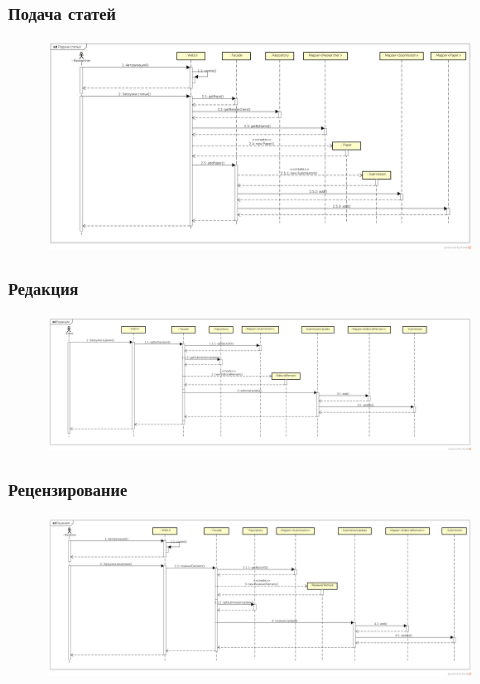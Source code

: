 \subsubsection{Подача статей}

\begin{figure}[H]
\centering
\includegraphics[width=\textwidth]{seq_researcher.png}
\caption{}
\end{figure}

\subsubsection{Редакция}

\begin{figure}[H]
\centering
\includegraphics[width=\textwidth]{seq_editor.png}
\caption{}
\end{figure}

\subsubsection{Рецензирование}

\begin{figure}[H]
\centering
\includegraphics[width=\textwidth]{seq_reviewer.png}
\caption{}
\end{figure}

